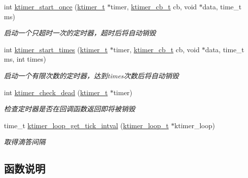 \begin{DoxyCompactItemize}
int \hyperlink{a00109_ga9c37409260a72e3218ae4fcaf44d79bc_ga9c37409260a72e3218ae4fcaf44d79bc}{ktimer\+\_\+start\+\_\+once} (\hyperlink{a00050_a846172ea4e8a86449eca41a3d8e074b7_a846172ea4e8a86449eca41a3d8e074b7}{ktimer\+\_\+t} $\ast$timer, \hyperlink{a00050_a2333fd0f2c3a85faf586300ca40deed4_a2333fd0f2c3a85faf586300ca40deed4}{ktimer\+\_\+cb\+\_\+t} cb, void $\ast$data, time\+\_\+t ms)
\begin{DoxyCompactList}\small\item\em 启动一个只超时一次的定时器，超时后将自动销毁 \end{DoxyCompactList}\item 
int \hyperlink{a00109_ga285936846760d9f325e588d2e2105fe5_ga285936846760d9f325e588d2e2105fe5}{ktimer\+\_\+start\+\_\+times} (\hyperlink{a00050_a846172ea4e8a86449eca41a3d8e074b7_a846172ea4e8a86449eca41a3d8e074b7}{ktimer\+\_\+t} $\ast$timer, \hyperlink{a00050_a2333fd0f2c3a85faf586300ca40deed4_a2333fd0f2c3a85faf586300ca40deed4}{ktimer\+\_\+cb\+\_\+t} cb, void $\ast$data, time\+\_\+t ms, int times)
\begin{DoxyCompactList}\small\item\em 启动一个有限次数的定时器，达到times次数后将自动销毁 \end{DoxyCompactList}\item 
int \hyperlink{a00109_ga9387b99ff760183fe8b61c8c46d6efc8_ga9387b99ff760183fe8b61c8c46d6efc8}{ktimer\+\_\+check\+\_\+dead} (\hyperlink{a00050_a846172ea4e8a86449eca41a3d8e074b7_a846172ea4e8a86449eca41a3d8e074b7}{ktimer\+\_\+t} $\ast$timer)
\begin{DoxyCompactList}\small\item\em 检查定时器是否在回调函数返回即将被销毁 \end{DoxyCompactList}\item 
time\+\_\+t \hyperlink{a00109_ga71282c2dc8bac0935617b1271f4066e6_ga71282c2dc8bac0935617b1271f4066e6}{ktimer\+\_\+loop\+\_\+get\+\_\+tick\+\_\+intval} (\hyperlink{a00050_a024af2aa29615e7a811ea6c45438157d_a024af2aa29615e7a811ea6c45438157d}{ktimer\+\_\+loop\+\_\+t} $\ast$ktimer\+\_\+loop)
\begin{DoxyCompactList}\small\item\em 取得滴答间隔 \end{DoxyCompactList}\end{DoxyCompactItemize}


\subsection{函数说明}
\hypertarget{a00109_ga9387b99ff760183fe8b61c8c46d6efc8_ga9387b99ff760183fe8b61c8c46d6efc8}{}
